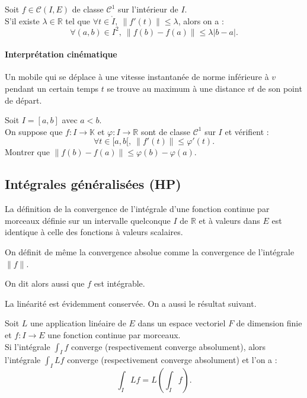 \documentclass[french]{article}
\newcommand{\R}{\mathbb{R}}
\newcommand{\K}{\mathbb{K}}
\theoremstyle{plain}
\theoremstyle{definition}
\theoremstyle{remark}
\begin{document}
\begin{thm}%
	Soit $f\in\mathcal{C}(I,E)$ de classe $\mathcal{C}^1$ sur l'intérieur de $I$.\\
	S'il existe $\lambda\in\R$ tel que $\forall t\in\mathring{I},\ \lVert f'(t)\rVert\leqslant\lambda$, alors on a :
	$$\forall (a,b)\in I^2,\ \lVert f(b)-f(a)\rVert\leqslant\lambda\lvert b-a\rvert.$$
\end{thm}

\paragraph{Interprétation cinématique}
Un mobile qui se déplace à une vitesse instantanée de norme inférieure à $v$ pendant un certain temps $t$ se trouve au maximum à une distance $vt$ de son point de départ.

\begin{exo}
	Soit $I=[a,b]$ avec $a<b$. \\
	On suppose que $f:I\to\K$ et $\varphi:I\to\R$ sont de classe $\mathcal{C}^1$ sur $I$ et vérifient :
	$$\forall t\in[a,b[,\ \lVert f'(t)\rVert\leqslant\varphi'(t).$$
	Montrer que $\lVert f(b)-f(a)\rVert\leqslant\varphi(b)-\varphi(a)$.
\end{exo}

\subsection{Intégrales généralisées (HP)}

La définition de la convergence de l'intégrale d'une fonction continue par morceaux définie sur un intervalle quelconque $I$ de $\R$ et à valeurs dans $E$ est identique à celle des fonctions à valeurs scalaires.

On définit de même la convergence absolue comme la convergence de l'intégrale $\lVert f\rVert$.

On dit alors aussi que $f$ est intégrable.

La linéarité est évidemment conservée. On a aussi le résultat suivant.

\begin{prop}%
	Soit $L$ une application linéaire de $E$ dans un espace vectoriel $F$ de dimension finie et $f:I\to E$ une fonction continue par morceaux.\\
	Si l'intégrale $\displaystyle\int_I f$ converge (respectivement converge absolument), alors l'intégrale $\displaystyle\int_I Lf$ converge (respectivement converge absolument) et l'on a :
	$$\int_I Lf=L\left(\int_I f\right).$$
\end{prop}
\end{document}
